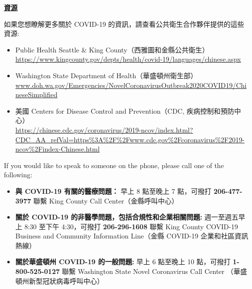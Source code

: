 \documentclass[10pt]{article}
\begin{document}
\bigskip

\large \underline{\textbf{資源}}

如果您想瞭解更多關於 COVID-19 的資訊，請查看公共衛生合作夥伴提供的這些資源:

\begin{itemize}
\item
  Public Health \textemdash Seattle \& King County（西雅圖和金縣公共衛生）\\
  \url{https://www.kingcounty.gov/depts/health/covid-19/languages/chinese.aspx}

\item

  Washington State Department of Health（華盛頓州衛生部）\\
  \url{www.doh.wa.gov/Emergencies/NovelCoronavirusOutbreak2020COVID19/ChineseSimplified}

\item
  美國 Centers for Disease Control and Prevention（CDC, 疾病控制和預防中心）\\
  \url{https://chinese.cdc.gov/coronavirus/2019-ncov/index.html?CDC\_AA\_refVal=https%3A%2F%2Fwww.cdc.gov%2Fcoronavirus%2F2019-ncov%2Findex-Chinese.html}

\end{itemize}

If you would like to speak to someone on the phone, please call one of the
following:

\begin{itemize}

\item

  \textbf{與 COVID-19 有關的醫療問題：} 早上 8 點至晚上 7 點，可撥打
  \textbf{206-477-3977} 聯繫 King County Call Center（金縣呼叫中心）

\item

  \textbf{關於 COVID-19 的非醫學問題，包括合規性和企業相關問題:} 週一至週五早上 8:30
  至下午 4:30，可撥打 \textbf{206-296-1608} 聯繫 King County COVID-19 Business and Community
  Information Line（金縣 COVID-19 企業和社區資訊熱線）

\item

  \textbf{關於華盛頓州 COVID-19 的一般問題:} 早上 6 點至晚上 10 點，可撥打
  \textbf{1-800-525-0127} 聯繫 Washington State Novel Coronavirus Call Center
  （華盛頓州新型冠狀病毒呼叫中心）

\end{itemize}
\end{document}
